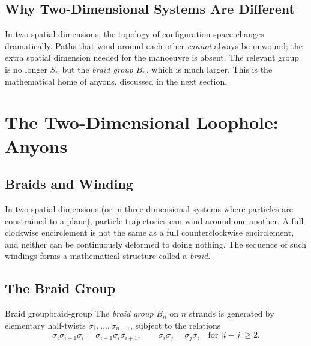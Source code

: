\documentclass[11pt,a4paper]{article}
\begin{document}
\subsection{Why Two-Dimensional Systems Are Different}

In two spatial dimensions, the topology of configuration space changes
dramatically.  Paths that wind around each other \emph{cannot} always be
unwound; the extra spatial dimension needed for the manoeuvre is absent.
The relevant group is no longer $S_n$ but the \emph{braid group} $B_n$, which
is much larger.  This is the mathematical home of anyons, discussed in the
next section.

\section{The Two-Dimensional Loophole: Anyons}
\label{sec:anyons}

\subsection{Braids and Winding}

In two spatial dimensions (or in three-dimensional systems where particles are
constrained to a plane), particle trajectories can wind around one another.
A full clockwise encirclement is not the same as a full counterclockwise
encirclement, and neither can be continuously deformed to doing nothing.
The sequence of such windings forms a mathematical structure called a \emph{braid}.

\subsection{The Braid Group}

\begin{defn}{Braid group}{braid-group}
  The \emph{braid group} $B_n$ on $n$ strands is generated by elementary
  half-twists $\sigma_1, \ldots, \sigma_{n-1}$, subject to the relations
  \[
    \sigma_i \sigma_{i+1} \sigma_i = \sigma_{i+1} \sigma_i \sigma_{i+1},
    \qquad
    \sigma_i \sigma_j = \sigma_j \sigma_i \quad\text{for } |i-j| \geq 2.
  \]
\end{defn}
\end{document}

